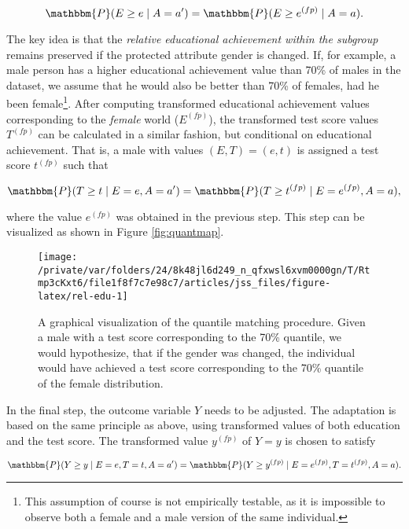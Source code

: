 \documentclass[
  nojss]{jss}
\begin{document}
\[\mathbbm{P}(E \geq e \mid A = a') = \mathbbm{P}(E \geq  {e}^{(fp)} \mid A = a).\]

The key idea is that the \emph{relative educational achievement within
the subgroup} remains preserved if the protected attribute gender is
changed. If, for example, a male person has a higher educational
achievement value than 70\% of males in the dataset, we assume that he
would also be better than 70\% of females, had he been female\footnote{This
  assumption of course is not empirically testable, as it is impossible
  to observe both a female and a male version of the same individual.}.
After computing transformed educational achievement values corresponding
to the \emph{female} world (\( {E}^{(fp)}\)), the transformed test score
values \( {T}^{(fp)}\) can be calculated in a similar fashion, but
conditional on educational achievement. That is, a male with values
\((E, T) = (e, t)\) is assigned a test score \( {t}^{(fp)}\) such that

\[\mathbbm{P}(T \geq t \mid E = e, A = a') = \mathbbm{P}(T \geq  {t}^{(fp)} \mid E =  {e}^{(fp)}, A = a),\]

where the value \( {e}^{(fp)}\) was obtained in the previous step. This
step can be visualized as shown in Figure \ref{fig:quantmap}.

\begin{CodeChunk}
\begin{figure}

{\centering \texttt{[image: /private/var/folders/24/8k48jl6d249\_n\_qfxwsl6xvm0000gn/T/Rtmp3cKxt6/file1f8f7c7e98c7/articles/jss\_files/figure-latex/rel-edu-1]} 

}

\caption{\label{fig:quantmap}A graphical visualization of the quantile matching procedure. Given a male with a test score corresponding to the 70\% quantile, we would hypothesize, that if the gender was changed, the individual would have achieved a test score corresponding to the 70\% quantile of the female distribution.}\label{fig:rel-edu}
\end{figure}
\end{CodeChunk}

In the final step, the outcome variable \(Y\) needs to be adjusted. The
adaptation is based on the same principle as above, using transformed
values of both education and the test score. The transformed value
\( {y}^{(fp)}\) of \(Y = y\) is chosen to satisfy

\[\mathbbm{P}(Y \geq y \mid E = e, T = t, A = a') = \mathbbm{P}(Y \geq  {y}^{(fp)} \mid E =  {e}^{(fp)}, T =  {t}^{(fp)}, A = a).\]
\end{document}
